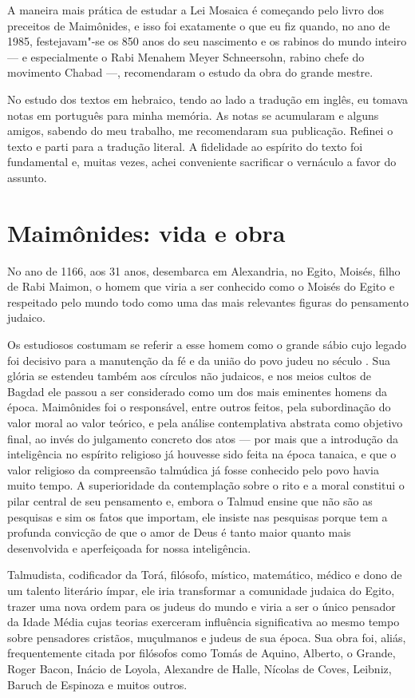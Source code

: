 A maneira mais prática de estudar a Lei Mosaica é começando pelo livro
dos preceitos de Maimônides, e isso foi exatamente o que eu fiz quando,
no ano de 1985, festejavam"-se os 850 anos do seu nascimento e os rabinos
do mundo inteiro --- e especialmente o Rabi Menahem Meyer Schneersohn,
rabino chefe do movimento Chabad ---, recomendaram o estudo da obra do
grande mestre.

No estudo dos textos em hebraico, tendo ao lado a tradução em inglês, eu
tomava notas em português para minha memória. As notas se acumularam e
alguns amigos, sabendo do meu trabalho, me recomendaram sua publicação.
Refinei o texto e parti para a tradução literal. A fidelidade ao
espírito do texto foi fundamental e, muitas vezes, achei conveniente
sacrificar o vernáculo a favor do assunto.

\section{Maimônides: vida e obra}

No ano de 1166, aos 31 anos, desembarca em Alexandria, no Egito, Moisés,
filho de Rabi Maimon, o homem que viria a ser conhecido como o Moisés
do Egito e respeitado pelo mundo todo como uma das mais relevantes
figuras do pensamento judaico.

Os estudiosos costumam se referir a esse homem como o grande sábio cujo legado foi decisivo 
para a manutenção da fé e da união do povo judeu no século .
Sua glória se estendeu também aos círculos não judaicos, e nos meios cultos de
Bagdad ele passou a ser considerado como um dos mais eminentes homens da
época. Maimônides foi o responsável, entre outros feitos, pela
subordinação do valor moral ao valor teórico, e pela análise
contemplativa abstrata como objetivo final, ao invés do julgamento
concreto dos atos --- por mais que a introdução da inteligência no espírito
religioso já houvesse sido feita na época tanaica, e que o valor
religioso da compreensão talmúdica já fosse conhecido pelo povo havia
muito tempo. A superioridade da contemplação sobre o rito e a moral
constitui o pilar central de seu pensamento e, embora o Talmud
ensine que não são as pesquisas e sim os fatos que importam, ele insiste
nas pesquisas porque tem a profunda convicção de que o amor de Deus é
tanto maior quanto mais desenvolvida e aperfeiçoada for nossa
inteligência.

Talmudista, codificador da Torá, filósofo, místico, matemático,
médico e dono de um talento literário ímpar, ele iria transformar a
comunidade judaica do Egito, trazer uma nova ordem para os judeus do
mundo e viria a ser o único pensador da Idade Média cujas teorias
exerceram influência significativa ao mesmo tempo sobre pensadores cristãos, muçulmanos 
e judeus de sua época. Sua obra foi, aliás,
frequentemente citada por filósofos como Tomás de Aquino, Alberto, o
Grande, Roger Bacon, Inácio de Loyola, Alexandre de Halle, Nícolas de
Coves, Leibniz, Baruch de Espinoza e muitos outros.

